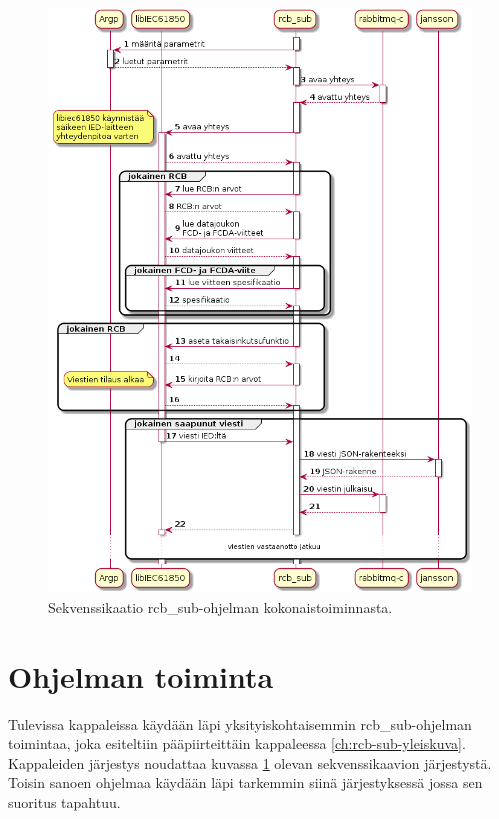 \begin{figure}[ht!]
	\includegraphics[width=1\textwidth]{pictures/rcb-sub-general-sd.png}
	\caption{Sekvenssikaatio rcb\_sub-ohjelman kokonaistoiminnasta.}
	\label{fig:rcb-sub-sekvenssikaavio}
\end{figure}


\section{Ohjelman toiminta}
\label{rcb-sub-toiminta}
Tulevissa kappaleissa käydään läpi yksityiskohtaisemmin rcb\_sub-ohjelman toimintaa, joka esiteltiin pääpiirteittäin kappaleessa \ref{ch:rcb-sub-yleiskuva}. Kappaleiden järjestys noudattaa kuvassa \ref{fig:rcb-sub-sekvenssikaavio} olevan sekvenssikaavion järjestystä. Toisin sanoen ohjelmaa käydään läpi tarkemmin siinä järjestyksessä jossa sen suoritus tapahtuu.


